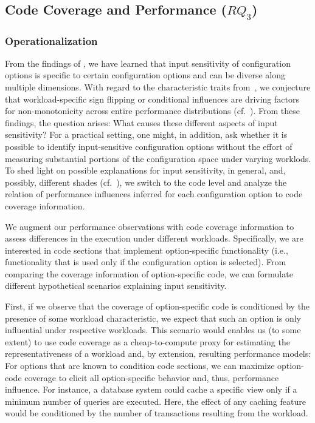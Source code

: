 {%
\subsection{Code Coverage and Performance ($RQ_3$)}\label{sec:rq3}\label{sec:categories}
\subsubsection{Operationalization} From the findings of , we have learned that input sensitivity of configuration options is specific to certain configuration options and can be diverse along multiple dimensions. With regard to the characteristic traits from~, we conjecture that workload-specific sign flipping or conditional influences are driving factors for non-monotonicity across entire performance distributions (cf.~). From these findings, the question arises: What causes these different aspects of input sensitivity? For a practical setting, one might, in addition, ask whether it is possible to identify input-sensitive configuration options without the effort of measuring substantial portions of the configuration space under varying worklods.
To shed light on possible explanations for input sensitivity, in general, and, possibly, different shades (cf.~), we switch to the code level and analyze the relation of performance influences inferred for each configuration option to code coverage information. 

We augment our performance observations with code coverage information to assess differences in the execution under different workloads. Specifically, we are interested in code sections that implement option-specific functionality (i.e., functionality that is used only if the configuration option is selected). From comparing the coverage information of option-specific code, we can formulate different hypothetical scenarios explaining input sensitivity. 

First, if we observe that the  coverage of option-specific code is conditioned by the presence of some workload characteristic, we expect that such an option is only influential under respective workloads. This scenario would enables us (to some extent) to use code coverage as a cheap-to-compute proxy for estimating the representativeness of a workload and, by extension, resulting performance models: For options that are known to condition code sections, we can maximize option-code coverage to elicit all option-specific behavior and, thus, performance influence. For instance, a database system could cache a specific view only if a minimum number of queries are executed. Here, the effect of any caching feature would be conditioned by the number of transactions resulting from the workload.

}

